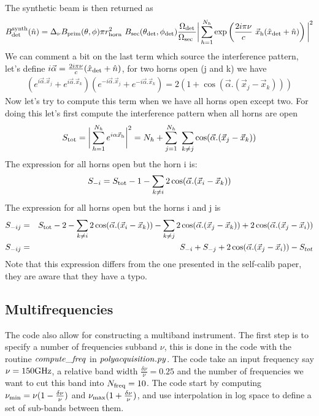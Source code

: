 \documentclass[a4paper, 11pt]{article}
\def\ba{\begin{eqnarray}}
\def\ea{\end{eqnarray}}
\begin{document}
The synthetic beam is then returned as
\ba
B^{\rm synth}_{\rm det}(\hat{n})= \Delta_{\nu} B_{\rm prim}(\theta, \phi) \pi r^{2}_{\rm horn}  B_{\rm sec}(\theta_{\rm det}, \phi_{\rm det}) \frac{\Omega_{\rm det}}{\Omega_{\rm sec} } \bigg| \sum^{N_{h}}_{h=1} \exp \left( \frac{2 i \pi \nu} {c}   \vec{x}_{\rm h} ( \hat{x}_{\rm det} + \hat{n} ) \right) \bigg|^{2}
\ea
We can comment a bit on the last term which source the interference pattern, let's define $i \vec{\alpha}= \frac{2 i \pi \nu} {c}  ( \hat{x}_{\rm det} + \hat{n} ) $, for two horns open (j and k) we have
\ba
( e^{i \vec{\alpha}. \vec{x}_{j}}+e^{i \vec{\alpha}. \vec{x}_{k}}   ) ( e^{-i \vec{\alpha}. \vec{x}_{j}}+e^{-i \vec{\alpha}. \vec{x}_{k}}   ) = 2(1+ \cos (\vec{\alpha}.(\vec{x}_{j}-\vec{x}_{k})))
\ea
Now let's try to compute this term when we have all horns open except two. For doing this let's first compute the interference pattern when all horns are open
\ba
S_{\rm tot} =\bigg| \sum^{N_{h}}_{h=1}  e^{ i \alpha \vec{x}_{\rm h}} \bigg|^{2} = N_{h} +\sum^{N_{h}}_{j=1}  \sum_{k \neq j}\cos (\vec{\alpha}.(\vec{x}_{j}-\vec{x}_{k}))
\ea
The expression for all horns open but the horn i is:
\ba
S_{-i} = S_{\rm tot} -1 - \sum_{k \neq i} 2 \cos (\vec{\alpha}.(\vec{x}_{i}-\vec{x}_{k}))
\ea
The expression for all horns open but the horns i and j is
\ba
S_{-ij} &=& S_{\rm tot} -2 - \sum_{k \neq i} 2 \cos (\vec{\alpha}.(\vec{x}_{i}-\vec{x}_{k}))- \sum_{k \neq  j} 2 \cos (\vec{\alpha}.(\vec{x}_{j}-\vec{x}_{k})) + 2 \cos (\vec{\alpha}.(\vec{x}_{j}-\vec{x}_{i})) \\ 
S_{-ij} &=& S_{-i} + S_{-j} + 2 \cos (\vec{\alpha}.(\vec{x}_{j}-\vec{x}_{i})) - S_{tot}
\ea
Note that this expression differs from the one presented in the self-calib paper, they are aware that they have a typo.


\subsection{Multifrequencies}

The code also allow for constructing a multiband instrument. The first step  is to specify a number of frequencies subband $\nu$, this is done in the code with the routine $\it{compute\_ freq}$ in  $\it{polyacquisition.py}$.
The code take an input frequency say $\nu=150 {\rm GHz}$, a relative band width $\frac{\delta \nu}{\nu}=0.25 $ and the number of frequencies we want to cut this band into $N_{\rm freq}=10$. The code start by computing $\nu_{\rm min}=\nu(1-\frac{\delta \nu}{\nu})$ and $\nu_{\rm max}(1+\frac{\delta \nu}{\nu})$, and use interpolation in log space to define a set of sub-bands between them.
\end{document}
